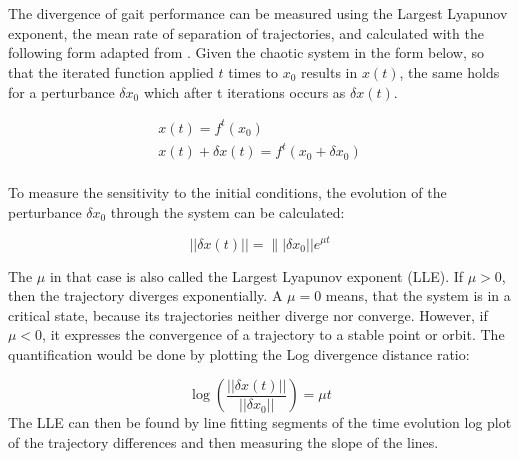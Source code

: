 \documentclass[main]{subfiles}
\begin{document}
\chapter{} %

\label{AppendixA} %

The divergence of gait performance can be measured using the Largest Lyapunov exponent, the mean rate of separation of trajectories, and calculated with the following form adapted from \cite{bib:Rosenstein1993}. %
%
Given the chaotic system in the form below, so that the iterated function applied \(t\) times to \(x_0\) results in \(x(t)\), the same holds for a perturbance \(\delta x_0\) which after t iterations occurs as \(\delta x(t)\).

\begin{align*}
x(t) = f^t(x_0)\\
x(t) + \delta x(t) = f^t(x_0 + \delta x_0)\\
\end{align*}

To measure the sensitivity to the initial conditions, the evolution of the perturbance \(\delta x_0\) through the system can be calculated:

\[||\delta x(t)|| = \||\delta x_0|| e^{\mu t}\]

The \(\mu\) in that case is also called the Largest Lyapunov exponent (LLE).%
%
If \(\mu > 0\), then the trajectory diverges exponentially. %
%
A \(\mu = 0\) means, that the system is in a critical state, because its trajectories neither diverge nor converge. %
%
However, if \(\mu < 0\), it expresses the convergence of a trajectory to a stable point or orbit. %
%
The quantification would be done by plotting the Log divergence distance ratio:

\[\log\left(\frac{||\delta x(t)||}{||\delta x_0||}\right) = \mu t\]
%
The LLE can then be found by line fitting segments of the time evolution log plot of the trajectory differences and then measuring the slope of the lines. %
\end{document}
